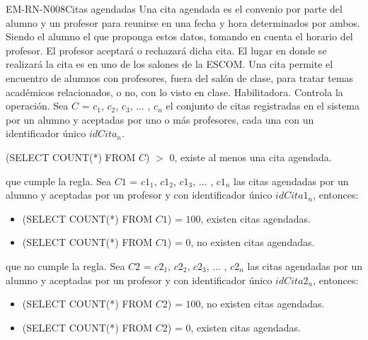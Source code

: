 \begin{BussinesRule}{EM-RN-N008}{Citas agendadas}
	\BRitem[Descripción:] Una cita agendada es el convenio por parte del alumno y un profesor para reunirse
	en una fecha y hora determinados por ambos. Siendo el alumno el que proponga estos datos, tomando
	en cuenta el horario del profesor. El profesor aceptará o rechazará dicha cita.
	El lugar en donde se realizará la cita es en uno de los salones de la ESCOM.
	Una cita permite el encuentro de alumnos con profesores, fuera del salón de clase, para tratar temas
	académicos relacionados, o no, con lo visto en clase.
	\BRitem[Tipo:] Habilitadora.
	\BRitem[Nivel:] Controla la operación.
	\BRitem[Sentencia: ] Sea $C$ = {$c_{1}$, $c_{2}$, $c_{3}$, ... , $c_{n}$} el conjunto de citas 
	registradas en el sistema por un alumno y aceptadas por uno o más profesores, cada una con un 
	identificador único $idCita_{n}$.
	\begin{center}
		(SELECT COUNT(*) FROM $C$) $>$ $0$, existe al menos una cita agendada.
	\end{center}
	
	 que cumple la regla.
		Sea $C1$ = {$c1_{1}$, $c1_{2}$, $c1_{3}$, ... , $c1_{n}$} las citas agendadas por un alumno y
		aceptadas por un profesor y con identificador único $idCita1_{n}$, entonces:
		\begin{itemize}
			\item (SELECT COUNT(*) FROM $C1$) = $100$, existen citas agendadas.
			\item (SELECT COUNT(*) FROM $C1$) = $0$, no existen citas agendadas.
		\end{itemize}
	 que no cumple la regla.
		Sea $C2$ = {$c2_{1}$, $c2_{2}$, $c2_{3}$, ... , $c2_{n}$} las citas agendadas por un alumno y
		aceptadas por un profesor y con identificador único $idCita2_{n}$, entonces:
		\begin{itemize}
			\item (SELECT COUNT(*) FROM $C2$) = $100$, no existen citas agendadas.
			\item (SELECT COUNT(*) FROM $C2$) = $0$, existen citas agendadas.
		\end{itemize}
\end{BussinesRule}

